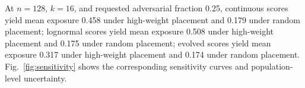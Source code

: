 At $n=128$, $k=16$, and requested adversarial fraction 0.25, continuous scores yield mean exposure 0.458 under high-weight placement and 0.179 under random placement; lognormal scores yield mean exposure 0.508 under high-weight placement and 0.175 under random placement; evolved scores yield mean exposure 0.317 under high-weight placement and 0.174 under random placement. Fig.~\ref{fig:sensitivity} shows the corresponding sensitivity curves and population-level uncertainty.
